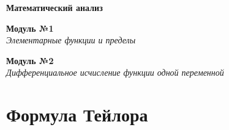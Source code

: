 


\begin{center}
	\Huge\textbf{Математический анализ}
\end{center}
\tableofcontents
\newpage

 \begin{center}
 \large{\textbf{Модуль №1} \\
 \textit{Элементарные функции и пределы}}
 \end{center}
 
 \newpage
 \zerocounter
 
 \newpage
 \zerocounter
 
 \newpage
 \zerocounter
 
 \newpage
 \zerocounter
 
 \newpage
 \zerocounter
 
 \newpage
 \zerocounter
 \begin{center}
 \large{\textbf{Модуль №2} \\
 \textit{Дифференциальное исчисление функции одной переменной}}
 \end{center}
 
 \newpage
 \zerocounter
 
 \zerocounter
 \newpage

\newpage
\zerocounter

\zerocounter
\newpage
\section{Формула Тейлора}
